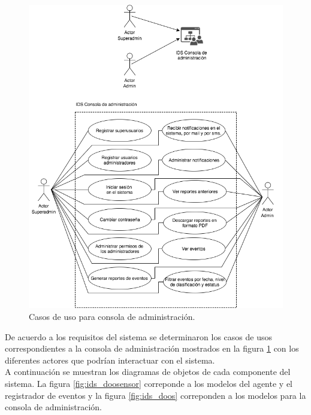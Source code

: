 \begin{figure}
	\centering
	\includegraphics[scale=.6]{images/Casos_de_uso_Report_Viewer}
	\caption{Casos de uso para consola de administración.}
	\label{fig:ids_ucrv}
\end{figure}

De acuerdo a los requisitos del sistema se determinaron los casos de usos correspondientes a la consola de administración mostrados en la figura \ref{fig:ids_ucrv} con los diferentes actores que podrían interactuar con el sistema. \\

A continuación se muestran los diagramas de objetos de cada componente del sistema. La figura \ref{fig:ids_doosensor} correponde a los modelos  del agente y el registrador de eventos y la figura \ref{fig:ids_doos} correponden a los modelos para la consola de administración. \\

